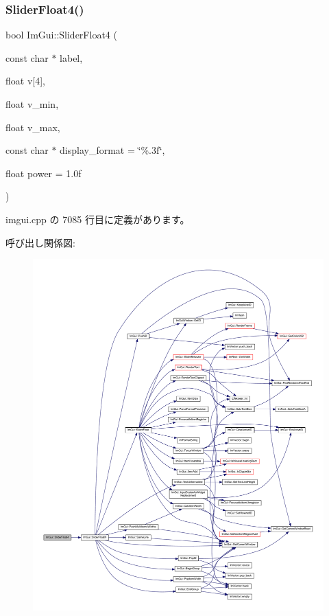 \subsubsection{\texorpdfstring{Slider\+Float4()}{SliderFloat4()}}
{\footnotesize\ttfamily bool Im\+Gui\+::\+Slider\+Float4 (\begin{DoxyParamCaption}\item[{const char $\ast$}]{label,  }\item[{float}]{v\mbox{[}4\mbox{]},  }\item[{float}]{v\+\_\+min,  }\item[{float}]{v\+\_\+max,  }\item[{const char $\ast$}]{display\+\_\+format = {\ttfamily \char`\"{}\%.3f\char`\"{}},  }\item[{float}]{power = {\ttfamily 1.0f} }\end{DoxyParamCaption})}



 imgui.\+cpp の 7085 行目に定義があります。

呼び出し関係図\+:\nopagebreak
\begin{figure}[H]
\begin{center}
\leavevmode
\includegraphics[width=350pt]{namespace_im_gui_aab6b7e99cab3975fece12fb1cd56e281_cgraph}
\end{center}
\end{figure}
\mbox{\label{namespace_im_gui_a3ffffbdfe59f18a2321dd1cb39dfb6e1}} 
